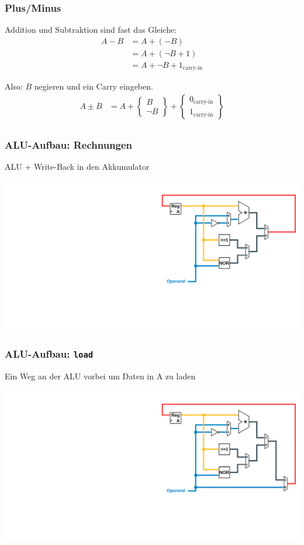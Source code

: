 \documentclass[t,aspectratio=169,usenames,dvipsnames]{beamer}
\begin{document}
\begin{frame}
  \frametitle{Plus/Minus}

  Addition und Subtraktion sind fast das Gleiche:
  \begin{align*}
    A - B &= A + (-B) \\
          &= A + (\neg B + 1) \\
          &= A \mathop{+} \neg B + 1_{\text{carry-in}}
  \end{align*}

  Also: $B$ negieren und ein Carry eingeben.
  \begin{align*}
    A \pm B &= A + \left\lbrace \begin{aligned} B \\ \neg B \end{aligned} \right\rbrace + \left\lbrace \begin{aligned} 0_{\text{carry-in}} \\ 1_{\text{carry-in}} \end{aligned} \right\rbrace\\
  \end{align*}
\end{frame}

\begin{frame}
  \frametitle{ALU-Aufbau: Rechnungen}

  \strut{}ALU + Write-Back in den Akkumulator

  \begin{center}
    \includegraphics[width=.85\textwidth]{sch-alu.pdf}
  \end{center}
\end{frame}

\begin{frame}
  \frametitle{ALU-Aufbau: \texttt{load}}

  \strut{}Ein Weg an der ALU vorbei um Daten in A zu laden

  \begin{center}
    \includegraphics[width=.85\textwidth]{sch-load.pdf}
  \end{center}
\end{frame}
\end{document}
